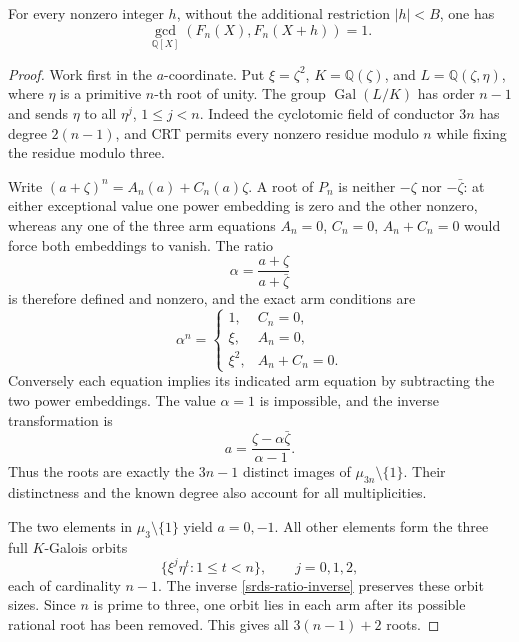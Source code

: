 \begin{proposition}
\label{srds-coprime}
For every nonzero integer \(h\), without the additional restriction
\(|h|<B\), one has
\[
 \gcd_{\mathbb Q[X]}(F_n(X),F_n(X+h))=1.
\]
\end{proposition}
\begin{proof}
Work first in the \(a\)-coordinate. Put
\(\xi=\zeta^2\), \(K=\mathbb Q(\zeta)\), and
\(L=\mathbb Q(\zeta,\eta)\), where \(\eta\) is a primitive
\(n\)-th root of unity. The group
\(\operatorname{Gal}(L/K)\) has order \(n-1\) and sends \(\eta\)
to all \(\eta^j\), \(1\le j<n\). Indeed the cyclotomic field of
conductor \(3n\) has degree \(2(n-1)\), and CRT permits every
nonzero residue modulo \(n\) while fixing the residue modulo three.

Write
\((a+\zeta)^n=A_n(a)+C_n(a)\zeta\).
A root of \(P_n\) is neither \(-\zeta\) nor \(-\bar\zeta\):
at either exceptional value one power embedding is zero and the
other nonzero, whereas any one of the three arm equations
\(A_n=0\), \(C_n=0\), \(A_n+C_n=0\) would force both embeddings
to vanish. The ratio
\[
 \alpha=\frac{a+\zeta}{a+\bar\zeta}
\]
is therefore defined and nonzero, and the exact arm conditions are
\begin{equation}
 \alpha^n=
 \begin{cases}
  1,&C_n=0,\\
  \xi,&A_n=0,\\
  \xi^2,&A_n+C_n=0.
 \end{cases}
 \label{srds-arm-phases}
\end{equation}
Conversely each equation implies its indicated arm equation by
subtracting the two power embeddings. The value \(\alpha=1\)
is impossible, and the inverse transformation is
\begin{equation}
 a=\frac{\zeta-\alpha\bar\zeta}{\alpha-1}.
 \label{srds-ratio-inverse}
\end{equation}
Thus the roots are exactly the \(3n-1\) distinct images of
\(\mu_{3n}\setminus\{1\}\). Their distinctness and the known degree
also account for all multiplicities.

The two elements in \(\mu_3\setminus\{1\}\) yield \(a=0,-1\).
All other elements form the three full \(K\)-Galois orbits
\[
 \{\xi^j\eta^t:1\le t<n\},\qquad j=0,1,2,
\]
each of cardinality \(n-1\). The inverse
\eqref{srds-ratio-inverse} preserves these orbit sizes.
Since \(n\) is prime to three, one orbit lies in each arm after
its possible rational root has been removed. This gives all
\(3(n-1)+2\) roots.


\end{proof}
